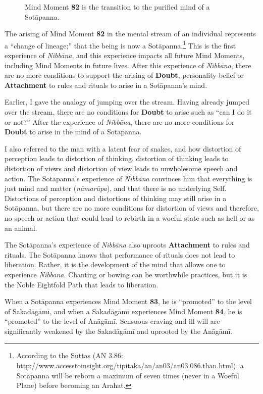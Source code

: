 \begin{figure}[H]
\centering

\caption{Mind Moment \textbf{82} is the transition to the purified mind of a Sotāpanna.}
\label{fig:Magga}
\end{figure}

The arising of Mind Moment \textbf{82} in the mental stream of an individual represents a “change of lineage;” that the being is now a Sotāpanna.\footnote{According to the Suttas (AN 3.86: \url{http://www.accesstoinsight.org/tipitaka/an/an03/an03.086.than.html}), a Sotāpanna will be reborn a maximum of seven times (never in a Woeful Plane) before becoming an Arahat.} This is the first experience of \textit{Nibbāna}, and this experience impacts all future Mind Moments, including Mind Moments in future lives. After this experience of \textit{Nibbāna}, there are no more conditions to support the arising of \textbf{Doubt}, personality-belief or \textbf{Attachment} to rules and rituals to arise in a Sotāpanna’s mind.

\pagebreak

Earlier, I gave the analogy of jumping over the stream. Having already jumped over the stream, there are no conditions for \textbf{Doubt} to arise such as “can I do it or not?” After the experience of \textit{Nibbāna}, there are no more conditions for \textbf{Doubt} to arise in the mind of a Sotāpanna.

I also referred to the man with a latent fear of snakes, and how distortion of perception leads to distortion of thinking, distortion of thinking leads to distortion of views and distortion of view leads to unwholesome speech and action. The Sotāpanna’s experience of \textit{Nibbāna} convinces him that everything is just mind and matter (\textit{nāmarūpa}), and that there is no underlying Self. Distortions of perception and distortions of thinking may still arise in a Sotāpanna, but there are no more conditions for distortion of views and therefore, no speech or action that could lead to rebirth in a woeful state such as hell or as an animal.

The Sotāpanna’s experience of \textit{Nibbāna} also uproots \textbf{Attachment} to rules and rituals. The Sotāpanna knows that performance of rituals does not lead to liberation. Rather, it is the development of the mind that allows one to experience \textit{Nibbāna}. Chanting or bowing can be worthwhile practices, but it is the Noble Eightfold Path that leads to liberation.

When a Sotāpanna experiences Mind Moment \textbf{83}, he is “promoted” to the level of Sakadāgāmī, and when a Sakadāgāmī experiences Mind Moment \textbf{84}, he is “promoted” to the level of Anāgāmī. Sensuous craving and ill will are significantly weakened by the Sakadāgāmī and uprooted by the Anāgāmī. 

